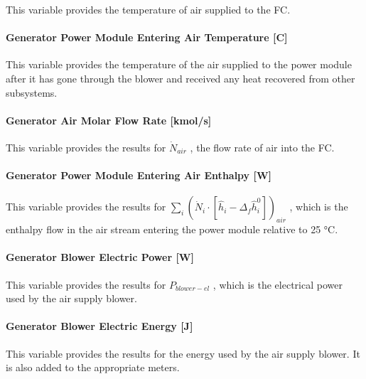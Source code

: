 This variable provides the temperature of air supplied to the FC.

\paragraph{Generator Power Module Entering Air Temperature {[}C{]}}\label{generator-power-module-entering-air-temperature-c}

This variable provides the temperature of the air supplied to the power module after it has gone through the blower and received any heat recovered from other subsystems.

\paragraph{Generator Air Molar Flow Rate {[}kmol/s{]}}\label{generator-air-molar-flow-rate-kmols}

This variable provides the results for \({\dot N_{air}}\) , the flow rate of air into the FC.

\paragraph{Generator Power Module Entering Air Enthalpy {[}W{]}}\label{generator-power-module-entering-air-enthalpy-w}

This variable provides the results for \({\sum\limits_i {\left( {{{\dot N}_i} \cdot \left[ {{{\hat h}_i} - {\Delta_f}\hat h_i^0} \right]} \right)}_{air}}\) , which is the enthalpy flow in the air stream entering the power module relative to 25 °C.

\paragraph{Generator Blower Electric Power {[}W{]}}\label{generator-blower-electric-power-w}

This variable provides the results for \({P_{blower - el}}\) , which is the electrical power used by the air supply blower.

\paragraph{Generator Blower Electric Energy {[}J{]}}\label{generator-blower-electric-energy-j}

This variable provides the results for the energy used by the air supply blower. It is also added to the appropriate meters.

